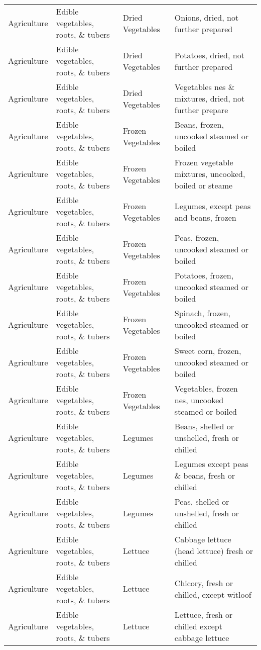 \begin{appendices}
\begin{xltabular}{\textwidth}{|p{0.07\textwidth}|p{0.28\textwidth}|p{0.24\textwidth}|p{0.31\textwidth}|}
	Agriculture & Edible vegetables, roots, \& tubers & Dried Vegetables & Onions, dried, not further prepared \\
	Agriculture & Edible vegetables, roots, \& tubers & Dried Vegetables & Potatoes, dried, not further prepared \\
	Agriculture & Edible vegetables, roots, \& tubers & Dried Vegetables & Vegetables nes \& mixtures, dried, not further prepare \\
	Agriculture & Edible vegetables, roots, \& tubers & Frozen Vegetables & Beans, frozen, uncooked steamed or boiled \\
	Agriculture & Edible vegetables, roots, \& tubers & Frozen Vegetables & Frozen vegetable mixtures, uncooked, boiled or steame \\
	Agriculture & Edible vegetables, roots, \& tubers & Frozen Vegetables & Legumes, except peas and beans, frozen \\
	Agriculture & Edible vegetables, roots, \& tubers & Frozen Vegetables & Peas, frozen, uncooked steamed or boiled \\
	Agriculture & Edible vegetables, roots, \& tubers & Frozen Vegetables & Potatoes, frozen, uncooked steamed or boiled \\
	Agriculture & Edible vegetables, roots, \& tubers & Frozen Vegetables & Spinach, frozen, uncooked steamed or boiled \\
	Agriculture & Edible vegetables, roots, \& tubers & Frozen Vegetables & Sweet corn, frozen, uncooked steamed or boiled \\
	Agriculture & Edible vegetables, roots, \& tubers & Frozen Vegetables & Vegetables, frozen nes, uncooked steamed or boiled \\
	Agriculture & Edible vegetables, roots, \& tubers & Legumes & Beans, shelled or unshelled, fresh or chilled \\
	Agriculture & Edible vegetables, roots, \& tubers & Legumes & Legumes except peas \& beans, fresh or chilled \\
	Agriculture & Edible vegetables, roots, \& tubers & Legumes & Peas, shelled or unshelled, fresh or chilled \\
	Agriculture & Edible vegetables, roots, \& tubers & Lettuce & Cabbage lettuce (head lettuce) fresh or chilled \\
	Agriculture & Edible vegetables, roots, \& tubers & Lettuce & Chicory, fresh or chilled, except witloof \\
	Agriculture & Edible vegetables, roots, \& tubers & Lettuce & Lettuce, fresh or chilled except cabbage lettuce \\

\end{xltabular}
\end{appendices}
